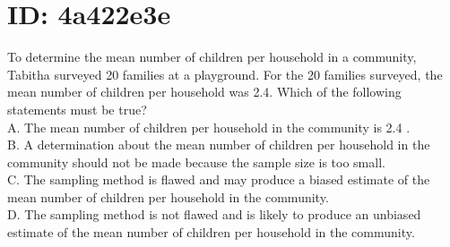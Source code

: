 \section*{ID: 4a422e3e}
To determine the mean number of children per household in a community, Tabitha surveyed 20 families at a playground. For the 20 families surveyed, the mean number of children per household was 2.4. Which of the following statements must be true?\\
A. The mean number of children per household in the community is 2.4 .\\
B. A determination about the mean number of children per household in the community should not be made because the sample size is too small.\\
C. The sampling method is flawed and may produce a biased estimate of the mean number of children per household in the community.\\
D. The sampling method is not flawed and is likely to produce an unbiased estimate of the mean number of children per household in the community.


